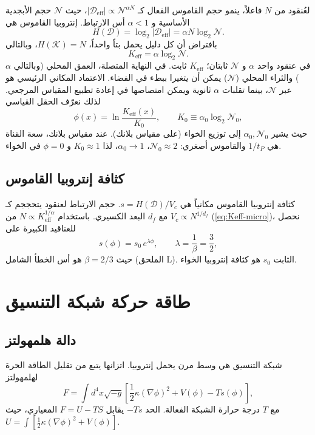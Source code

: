 \documentclass[12pt,a4paper]{article}
\newcommand{\Dir}{\mathcal{D}}
\begin{document}
	لعُنقود من \(N\) فاعلاً، ينمو حجم القاموس الفعال كـ \(|\Dir_{\mathrm{eff}}| \propto \mathcal{N}^{\alpha N}\)، حيث \(\mathcal{N}\) حجم الأبجدية الأساسية و \(\alpha<1\) أس الارتباط. إنتروبيا القاموس هي
	\[
	H(\Dir) = \log_2 |\Dir_{\mathrm{eff}}| = \alpha N \log_2 \mathcal{N}.
	\]
	بافتراض أن كل دليل يحمل بتاً واحداً، \(H(\mathcal{K}) = N\)، وبالتالي
	\begin{equation}
		K_{\mathrm{eff}} = \alpha \log_2 \mathcal{N}. \label{eq:Keff-micro}
	\end{equation}
	في عنقود واحد \(\alpha\) و \(\mathcal{N}\) ثابتان؛ \(K_{\mathrm{eff}}\) ثابت. في النهاية المتصلة، العمق المحلي (وبالتالي \(\alpha\)) والثراء المحلي (\(\mathcal{N}\)) يمكن أن يتغيرا ببطء في الفضاء. الاعتماد المكاني الرئيسي هو عبر \(\mathcal{N}\)، بينما تقلبات \(\alpha\) ثانوية ويمكن امتصاصها في إعادة تطبيع المقياس المرجعي. لذلك نعرّف الحقل القياسي
	\begin{equation}
		\phi(x) = \ln \frac{K_{\mathrm{eff}}(x)}{K_0}, \qquad K_0 \equiv \alpha_0 \log_2 \mathcal{N}_0,
		\label{eq:phi-def}
	\end{equation}
	حيث يشير \(\alpha_0,\mathcal{N}_0\) إلى توزيع الخواء (على مقياس بلانك). عند مقياس بلانك، سعة القناة هي \(1/t_P\) والقاموس أصغري: \(\mathcal{N}_0 \approx 2\)، \(\alpha_0 \rightarrow 1\)، لذا \(K_0 \approx 1\) و \(\phi=0\) في الخواء.
	
	\subsection{كثافة إنتروبيا القاموس}
	كثافة إنتروبيا القاموس مكانياً هي \(s = H(\Dir)/V_c\). حجم الارتباط لعنقود يتحججم كـ \(V_c \propto N^{1/d_f}\) مع \(d_f\) البعد الكسيري. باستخدام \(N \propto K_{\mathrm{eff}}^{1/\alpha}\) من (\ref{eq:Keff-micro})، نحصل للعناقيد الكبيرة على
	\begin{equation}
		s(\phi) = s_0\, e^{\lambda\phi}, \qquad \lambda = \frac{1}{\beta} = \frac{3}{2},
		\label{eq:s-phi}
	\end{equation}
	حيث \(\beta = 2/3\) هو أس الخطأ الشامل (الملحق L). الثابت \(s_0\) هو كثافة إنتروبيا الخواء.
	
	\section{طاقة حركة شبكة التنسيق}
	
	\subsection{دالة هلمهولتز}
	شبكة التنسيق هي وسط مرن يحمل إنتروبيا. اتزانها يتبع من تقليل الطاقة الحرة لهلمهولتز
	\begin{equation}
		F = \int d^4x \sqrt{-g} \left[ \frac{1}{2}\kappa (\nabla\phi)^2 + V(\phi) - T s(\phi) \right],
		\label{eq:F}
	\end{equation}
	مع \(T\) درجة حرارة الشبكة الفعالة. الحد \(-Ts\) يقابل \(F = U - TS\) المعياري، حيث \(U = \int [\frac12\kappa(\nabla\phi)^2 + V(\phi)]\).
	
\end{document}
